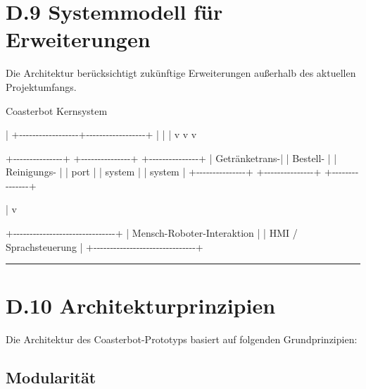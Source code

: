 \documentclass[
]{article}
\newenvironment{Shaded}{}{}
\newcommand{\NormalTok}[1]{#1}
\begin{document}
\section{D.9 Systemmodell für
Erweiterungen}\label{d.9-systemmodell-fuxfcr-erweiterungen}

Die Architektur berücksichtigt zukünftige Erweiterungen außerhalb des
aktuellen Projektumfangs.

\begin{Shaded}
\begin{Highlighting}[]
\NormalTok{                    Coasterbot Kernsystem}

\NormalTok{                           |}
\NormalTok{        +{-}{-}{-}{-}{-}{-}{-}{-}{-}{-}{-}{-}{-}{-}{-}{-}{-}{-}+{-}{-}{-}{-}{-}{-}{-}{-}{-}{-}{-}{-}{-}{-}{-}{-}{-}{-}+}
\NormalTok{        |                  |                  |}
\NormalTok{        v                  v                  v}

\NormalTok{+{-}{-}{-}{-}{-}{-}{-}{-}{-}{-}{-}{-}{-}{-}{-}+  +{-}{-}{-}{-}{-}{-}{-}{-}{-}{-}{-}{-}{-}{-}{-}+  +{-}{-}{-}{-}{-}{-}{-}{-}{-}{-}{-}{-}{-}{-}{-}+}
\NormalTok{| Getränketrans{-}|  | Bestell{-}      |  | Reinigungs{-}   |}
\NormalTok{| port          |  | system        |  | system        |}
\NormalTok{+{-}{-}{-}{-}{-}{-}{-}{-}{-}{-}{-}{-}{-}{-}{-}+  +{-}{-}{-}{-}{-}{-}{-}{-}{-}{-}{-}{-}{-}{-}{-}+  +{-}{-}{-}{-}{-}{-}{-}{-}{-}{-}{-}{-}{-}{-}{-}+}

\NormalTok{        |}
\NormalTok{        v}

\NormalTok{+{-}{-}{-}{-}{-}{-}{-}{-}{-}{-}{-}{-}{-}{-}{-}{-}{-}{-}{-}{-}{-}{-}{-}{-}{-}{-}{-}{-}{-}{-}{-}+}
\NormalTok{| Mensch{-}Roboter{-}Interaktion    |}
\NormalTok{| HMI / Sprachsteuerung         |}
\NormalTok{+{-}{-}{-}{-}{-}{-}{-}{-}{-}{-}{-}{-}{-}{-}{-}{-}{-}{-}{-}{-}{-}{-}{-}{-}{-}{-}{-}{-}{-}{-}{-}+}
\end{Highlighting}
\end{Shaded}

\begin{center}\rule{0.5\linewidth}{0.5pt}\end{center}

\section{D.10 Architekturprinzipien}\label{d.10-architekturprinzipien}

Die Architektur des Coasterbot-Prototyps basiert auf folgenden
Grundprinzipien:

\subsection{Modularität}\label{modularituxe4t-1}
\end{document}
